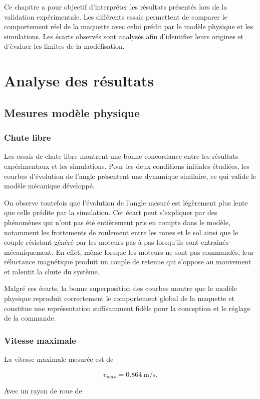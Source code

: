 
Ce chapitre a pour objectif d'interpréter les résultats présentés lors de la validation expérimentale. Les différents essais permettent de comparer le comportement réel de la maquette avec celui prédit par le modèle physique et les simulations. Les écarts observés sont analysés afin d'identifier leurs origines et d'évaluer les limites de la modélisation.
\section{Analyse des résultats}
\subsection{Mesures modèle physique}

\subsubsection{Chute libre}

Les essais de chute libre montrent une bonne concordance entre les résultats expérimentaux et les simulations. Pour les deux conditions initiales étudiées, les courbes d'évolution de l'angle présentent une dynamique similaire, ce qui valide le modèle mécanique développé.

On observe toutefois que l'évolution de l'angle mesuré est légèrement plus lente que celle prédite par la simulation. Cet écart peut s'expliquer par des phénomènes qui n'ont pas été entièrement pris en compte dans le modèle, notamment les frottements de roulement entre les roues et le sol ainsi que le couple résistant généré par les moteurs pas à pas lorsqu'ils sont entraînés mécaniquement. En effet, même lorsque les moteurs ne sont pas commandés, leur réluctance magnétique produit un couple de retenue qui s'oppose au mouvement et ralentit la chute du système.

Malgré ces écarts, la bonne superposition des courbes montre que le modèle physique reproduit correctement le comportement global de la maquette et constitue une représentation suffisamment fidèle pour la conception et le réglage de la commande.
\subsubsection{Vitesse maximale}

La vitesse maximale mesurée est de

\[
v_{max}=0.864~\si{\meter\per\second}.
\]

Avec un rayon de roue de

